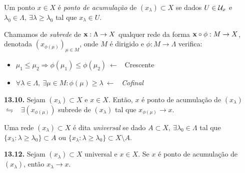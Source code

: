 \begin{definition}
    Um ponto \(x \in X\) é \emph{ponto de acumulação} de \((x_\lambda) \subset X\) se dados \(U \in \mathcal{U}_x\) e \(\lambda_0 \in \Lambda, \ \exists \lambda \geq \lambda_0\) tal que \( x_\lambda \in U\).
\end{definition}

\begin{definition}
    Chamamos de \emph{subrede} de \(\textbf{x} : \Lambda \to X\) qualquer rede da forma \(\textbf{x} \circ \phi : M \to X\), denotada \((x_{\phi(\mu)})_{\mu \in M}\), onde \(M \) é dirigido e \(\phi:M \to \Lambda\) verifica:
    \vspace{-0.2cm}
    \begin{itemize}[left = 1.8cm]
        \item[(Sr1)] \(\mu_1 \leq \mu_2 \Rightarrow \phi(\mu_1) \leq \phi(\mu_2) \ \leftarrow\) \ Crescente 
        \item[(Sr2)] \(\forall  \lambda \in \Lambda, \ \exists \mu \in M : \phi(\mu )\geq \lambda\ \leftarrow\) \ \emph{Cofinal}
    \end{itemize}
\end{definition}

\begin{proposition}
    \textbf{13.10.} Sejam \((x_\lambda) \subset X\) e \(x \in X\). Então, \(x\) é ponto de acumulação de \((x_\lambda)\) \ \(\leftrightharpoons\) \ \(\exists (x_{\phi(\mu)})\) subrede de \((x_\lambda)\) tal que \(  x_{\phi(\mu)} \to x\). 
\end{proposition}


\begin{definition}
    Uma rede \((x_\lambda) \subset X\) é dita \emph{universal} se dado \(A \subset X, \ \exists \lambda_0 \in \Lambda \) tal que \(\{x_\lambda : \lambda \geq \lambda_0\} \subset A\) ou \(\{x_\lambda : \lambda \geq \lambda_0\} \subset X \setminus A\).
\end{definition}

\begin{proposition}
    \textbf{13.12.} Sejam \((x_\lambda) \subset X\) universal e \(x\in X\). Se \(x\) é ponto de acumulação de \((x_\lambda)\), então \(x_\lambda \to x\). 
\end{proposition}


